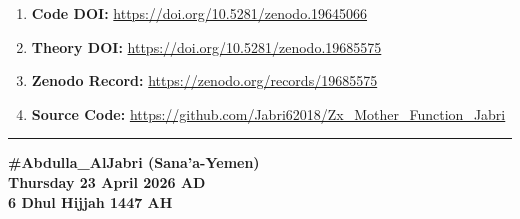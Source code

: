 \documentclass[12pt,a4paper]{article}
\begin{document}
\begin{enumerate}
\item \textbf{Code DOI:} \url{https://doi.org/10.5281/zenodo.19645066}
\item \textbf{Theory DOI:} \url{https://doi.org/10.5281/zenodo.19685575}
\item \textbf{Zenodo Record:} \url{https://zenodo.org/records/19685575}
\item \textbf{Source Code:} \url{https://github.com/Jabri62018/Zx_Mother_Function_Jabri}
\end{enumerate}

\vspace{0.5cm}
\hrule
\vspace{0.5cm}

\textbf{\#Abdulla\_AlJabri (Sana'a-Yemen)} \\
\textbf{Thursday 23 April 2026 AD} \\
\textbf{6 Dhul Hijjah 1447 AH}
\end{document}
